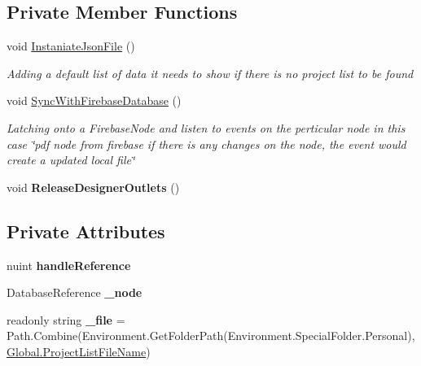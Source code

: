 \subsection*{Private Member Functions}
\begin{DoxyCompactItemize}
\item 
void \hyperlink{class_ramboell_1_1i_o_s_1_1_project_list_view_controller_a037a0f546ea6fcf14af695751464b781}{Instaniate\+Json\+File} ()
\begin{DoxyCompactList}\small\item\em Adding a default list of data it needs to show if there is no project list to be found \end{DoxyCompactList}\item 
void \hyperlink{class_ramboell_1_1i_o_s_1_1_project_list_view_controller_aea12a1a3796492b53f800400f1ea92be}{Sync\+With\+Firebase\+Database} ()
\begin{DoxyCompactList}\small\item\em Latching onto a Firebase\+Node and listen to events on the perticular node in this case \char`\"{}pdf node from firebase if there is any changes on the node, the event would create a updated local file\char`\"{} \end{DoxyCompactList}\item 
\mbox{\label{class_ramboell_1_1i_o_s_1_1_project_list_view_controller_a8cfe3c5a97cb35ed9fc0f669441db8e1}} 
void {\bfseries Release\+Designer\+Outlets} ()
\end{DoxyCompactItemize}
\subsection*{Private Attributes}
\begin{DoxyCompactItemize}
\item 
\mbox{\label{class_ramboell_1_1i_o_s_1_1_project_list_view_controller_a72fcd6ac2788386867749cbf040663e8}} 
nuint {\bfseries handle\+Reference}
\item 
\mbox{\label{class_ramboell_1_1i_o_s_1_1_project_list_view_controller_a4ad3f8af1c55c3a53c030a4a8933595f}} 
Database\+Reference {\bfseries \+\_\+node}
\item 
\mbox{\label{class_ramboell_1_1i_o_s_1_1_project_list_view_controller_aebf9f6d35e9d5542080a81597994aa79}} 
readonly string {\bfseries \+\_\+file} = Path.\+Combine(Environment.\+Get\+Folder\+Path(Environment.\+Special\+Folder.\+Personal), \hyperlink{class_ramboell_1_1i_o_s_1_1_global_a23d8cd28e3aa412d459934cd1ec82a74}{Global.\+Project\+List\+File\+Name})
\end{DoxyCompactItemize}


